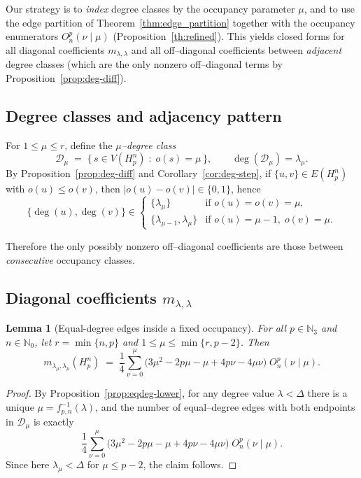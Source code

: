 \documentclass[letterpaper,12pt]{article}
\newtheorem{lemma}{Lemma}
\begin{document}
Our strategy is to \emph{index} degree classes by the occupancy parameter $\mu$, and to use the
edge partition of Theorem~\ref{thm:edge_partition}  together with the occupancy
enumerators $O_n^p(\nu\mid \mu)$ (Proposition~\ref{th:refined}).  This yields closed forms
for all diagonal coefficients $m_{\lambda,\lambda}$ and all off–diagonal coefficients
between \emph{adjacent} degree classes (which are the only nonzero off–diagonal terms by
Proposition~\ref{prop:deg-diff}).

\subsection*{Degree classes and adjacency pattern}

For $1\le \mu\le r$, define the \emph{$\mu$–degree class}
\[
\mathcal{D}_\mu \;=\;\{\, s\in V(H_p^n) \;:\; o(s)=\mu \,\},
\qquad
\deg(\mathcal{D}_\mu)=\lambda_\mu.
\]
By Proposition~\ref{prop:deg-diff} and Corollary~\ref{cor:deg-step},
if $\{u,v\}\in E(H_p^n)$ with $o(u)\le o(v)$, then $|o(u)-o(v)|\in\{0,1\}$, hence
\begin{equation}
    \{\deg(u),\deg(v)\}\in
\begin{cases}
\{\lambda_\mu\} & \text{if } o(u)=o(v)=\mu,\\[2mm]
\{\lambda_{\mu-1},\lambda_\mu\} & \text{if } o(u)=\mu-1,\;o(v)=\mu.
\end{cases}
\end{equation}

Therefore the only possibly nonzero off–diagonal coefficients are those between \emph{consecutive}
occupancy classes.

\subsection*{Diagonal coefficients $m_{\lambda,\lambda}$}

\begin{lemma}[Equal-degree edges inside a fixed occupancy]
\label{lem:eqdeg-lower}
For all $p \in \mathbb{N}_3$ and $n \in \mathbb{N}_0$,  let $r = \min\{n, p\}$ and  $1\le \mu\le \min\{r,p-2\}$. Then
\begin{equation}
    m_{\lambda_\mu,\lambda_\mu}(H_p^n)
\;=\;
\frac14\sum_{\nu=0}^{\mu}
\Big(3\mu^2-2p\mu-\mu+4p\nu-4\mu\nu\Big)\; O_n^p(\nu\mid \mu).
\end{equation}
\end{lemma}

\begin{proof}
By Proposition~\ref{prop:eqdeg-lower}, for any degree value
$\lambda<\Delta$ there is a unique $\mu=f_{p,n}^{-1}(\lambda)$, and the number of equal–degree
edges with both endpoints in $\mathcal{D}_\mu$ is exactly
\[
\frac14\sum_{\nu=0}^{\mu}
\Big(3\mu^2-2p\mu-\mu+4p\nu-4\mu\nu\Big)\; O_n^p(\nu\mid \mu).
\]
Since here $\lambda_\mu<\Delta$ for $\mu\le p-2$, the claim follows.
\end{proof}
\end{document}
